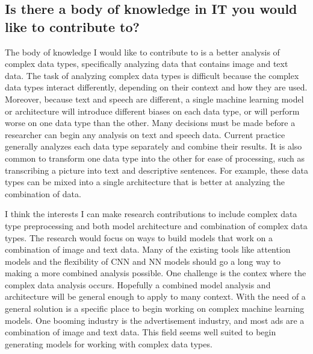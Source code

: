 \subsection{Is there a body of knowledge in IT you would like to contribute to?}



The body of knowledge I would like to contribute to is a better analysis of complex data types, specifically analyzing data that contains image and text data.  The task of analyzing complex data types is difficult because the complex data types interact differently, depending on their context and how they are used.  Moreover, because text and speech are different, a single machine learning model or architecture will introduce different biases on each data type, or will perform worse on one data type than the other. Many decisions must be made before a researcher can begin any analysis on text and speech data. Current practice generally analyzes each data type separately and combine their results. It is also common to transform one data type into the other for ease of processing, such as transcribing a picture into text and descriptive sentences. For example, these data types can be mixed into a single architecture that is better at analyzing the combination of data.  

I think the interests I can make research contributions to include complex data type preprocessing and both model architecture and combination of complex data types.  The research would focus on ways to build models that work on a combination of image and text data.  Many of the existing tools like attention models and the flexibility of CNN and NN models should go a long way to making a more combined analysis possible.  One challenge is the contex where the complex data analysis occurs.  Hopefully a combined model analysis and architecture will be general enough to apply to many context.  With the need of a general solution is a specific place to begin working on complex machine learning models.  One booming industry is the advertisement industry, and most ads are a combination of image and text data.  This field seems well suited to begin generating models for working with complex data types.  
